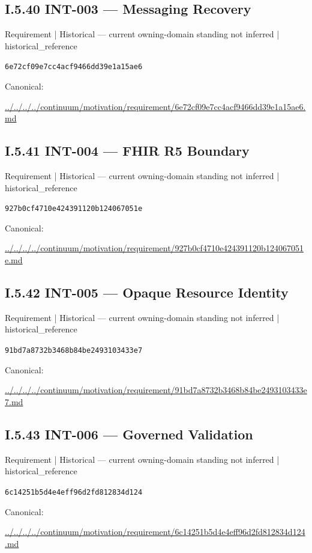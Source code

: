 \documentclass[10pt,a4paper]{article}
\begin{document}
\subsection*{I.5.40 INT-003 — Messaging Recovery}
\label{element-6e72cf09e7cc4acf9466dd39e1a15ae6}
{\small Requirement | Historical — current owning-domain standing not inferred | historical\_reference}\par
\texttt{6e72cf09e7cc4acf9466dd39e1a15ae6}\par
Canonical: \par
{\footnotesize\url{../../../../continuum/motivation/requirement/6e72cf09e7cc4acf9466dd39e1a15ae6.md}}\par
\subsection*{I.5.41 INT-004 — FHIR R5 Boundary}
\label{element-927b0cf4710e424391120b124067051e}
{\small Requirement | Historical — current owning-domain standing not inferred | historical\_reference}\par
\texttt{927b0cf4710e424391120b124067051e}\par
Canonical: \par
{\footnotesize\url{../../../../continuum/motivation/requirement/927b0cf4710e424391120b124067051e.md}}\par
\subsection*{I.5.42 INT-005 — Opaque Resource Identity}
\label{element-91bd7a8732b3468b84be2493103433e7}
{\small Requirement | Historical — current owning-domain standing not inferred | historical\_reference}\par
\texttt{91bd7a8732b3468b84be2493103433e7}\par
Canonical: \par
{\footnotesize\url{../../../../continuum/motivation/requirement/91bd7a8732b3468b84be2493103433e7.md}}\par
\subsection*{I.5.43 INT-006 — Governed Validation}
\label{element-6c14251b5d4e4eff96d2fd812834d124}
{\small Requirement | Historical — current owning-domain standing not inferred | historical\_reference}\par
\texttt{6c14251b5d4e4eff96d2fd812834d124}\par
Canonical: \par
{\footnotesize\url{../../../../continuum/motivation/requirement/6c14251b5d4e4eff96d2fd812834d124.md}}\par
\end{document}
